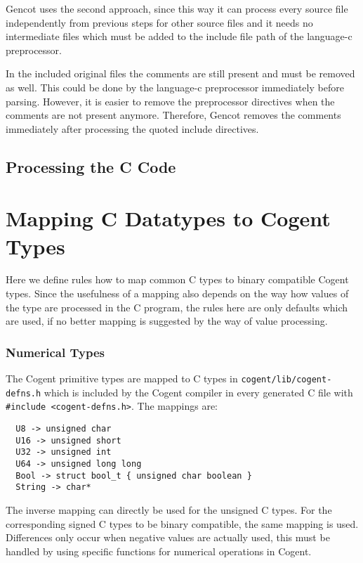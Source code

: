 \documentclass[a4paper]{report}
\newcommand{\code}[1]{\textnormal{\texttt{#1}}}
\begin{document}
Gencot uses the second approach, since this way it can process every source file independently from previous steps for 
other source files and it needs no intermediate files which must be added to the include file path of the language-c
preprocessor.

In the included original files the comments are still present and must be removed as well. This could be done 
by the language-c preprocessor immediately before parsing. However, it is easier to remove the preprocessor
directives when the comments are not present anymore. Therefore, Gencot removes the comments immediately after
processing the quoted include directives.

\subsection{Processing the C Code}




\section{Mapping C Datatypes to Cogent Types}
\label{design-types}

Here we define rules how to map common C types to binary compatible Cogent types. Since the usefulness of a mapping
also depends on the way how values of the type are processed in the C program, the rules here are only defaults
which are used, if no better mapping is suggested by the way of value processing.

\subsubsection{Numerical Types}

The Cogent primitive types are mapped to C types in \code{cogent/lib/cogent-defns.h} which is included by the Cogent compiler
in every generated C file with \code{\#include <cogent-defns.h>}. The mappings are: 
\begin{verbatim}
  U8 -> unsigned char
  U16 -> unsigned short 
  U32 -> unsigned int
  U64 -> unsigned long long
  Bool -> struct bool_t { unsigned char boolean }
  String -> char*
\end{verbatim}
The inverse mapping can directly be used for the unsigned C types. For the corresponding signed C types to be binary
compatible, the same mapping is used. Differences only occur when negative values are actually used, this must be handled by using specific functions for numerical operations in Cogent.
\end{document}
